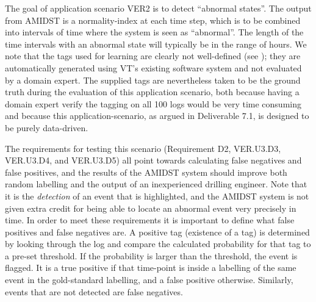 The goal of application scenario VER2 is to detect ``abnormal states''.  The output from AMIDST is  a normality-index  at each time step, which is to be combined into intervals of time where the system is seen as ``abnormal''. 
The length of the time intervals with an abnormal state will typically be in the range of hours. 
We note that the tags used for learning are clearly not well-defined (see ); they are automatically generated using VT's existing software system and not evaluated by a domain expert.  
The supplied tags are nevertheless taken to be the ground truth during the evaluation of this application scenario, both because having a domain expert verify the tagging on all 100 logs would be very time consuming and because this application-scenario, as argued in Deliverable 7.1, is designed to be purely data-driven. 

The requirements for testing this scenario (Requirement D2, VER.U3.D3, VER.U3.D4, and VER.U3.D5) all point towards calculating false negatives and false positives, and the results of the AMIDST system should improve both random labelling and the output of an inexperienced  drilling engineer. 
Note that it is the \textit{detection} of an event that is highlighted, and the AMIDST system is not given extra credit for being able to locate an abnormal event very precisely in time. 
In order to meet these requirements it is important to define  what false positives and false negatives are.  
A positive tag (existence of a tag) is determined by looking through the log and compare  the calculated probability for that tag to a pre-set threshold. 
If the probability is larger than the threshold, the event is flagged. It is a true positive if that time-point is inside a labelling of the same event in the gold-standard labelling, and  a false positive otherwise. 
Similarly, events that are not detected are false negatives. 


